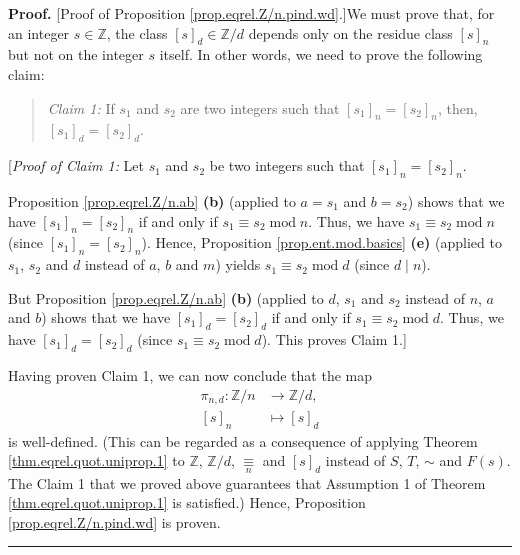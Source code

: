 \documentclass[numbers=enddot,12pt,final,onecolumn,notitlepage]{scrartcl}%
\numberwithin{exer}{subsection}
\theoremstyle{definition}
\newenvironment{statement}{\begin{quote}}{\end{quote}}
\newenvironment{proof}[1][Proof]{\noindent\textbf{#1.} }{\ \rule{0.5em}{0.5em}}
\begin{document}
\begin{proof}
[Proof of Proposition \ref{prop.eqrel.Z/n.pind.wd}.]We must prove that, for an
integer $s\in\mathbb{Z}$, the class $\left[  s\right]  _{d}\in\mathbb{Z}/d$
depends only on the residue class $\left[  s\right]  _{n}$ but not on the
integer $s$ itself. In other words, we need to prove the following claim:

\begin{statement}
\textit{Claim 1:} If $s_{1}$ and $s_{2}$ are two integers such that $\left[
s_{1}\right]  _{n}=\left[  s_{2}\right]  _{n}$, then, $\left[  s_{1}\right]
_{d}=\left[  s_{2}\right]  _{d}$.
\end{statement}

[\textit{Proof of Claim 1:} Let $s_{1}$ and $s_{2}$ be two integers such that
$\left[  s_{1}\right]  _{n}=\left[  s_{2}\right]  _{n}$.

Proposition \ref{prop.eqrel.Z/n.ab} \textbf{(b)} (applied to $a=s_{1}$ and
$b=s_{2}$) shows that we have $\left[  s_{1}\right]  _{n}=\left[
s_{2}\right]  _{n}$ if and only if $s_{1}\equiv s_{2}\operatorname{mod}n$.
Thus, we have $s_{1}\equiv s_{2}\operatorname{mod}n$ (since $\left[
s_{1}\right]  _{n}=\left[  s_{2}\right]  _{n}$). Hence, Proposition
\ref{prop.ent.mod.basics} \textbf{(e)} (applied to $s_{1}$, $s_{2}$ and $d$
instead of $a$, $b$ and $m$) yields $s_{1}\equiv s_{2}\operatorname{mod}d$
(since $d\mid n$).

But Proposition \ref{prop.eqrel.Z/n.ab} \textbf{(b)} (applied to $d$, $s_{1}$
and $s_{2}$ instead of $n$, $a$ and $b$) shows that we have $\left[
s_{1}\right]  _{d}=\left[  s_{2}\right]  _{d}$ if and only if $s_{1}\equiv
s_{2}\operatorname{mod}d$. Thus, we have $\left[  s_{1}\right]  _{d}=\left[
s_{2}\right]  _{d}$ (since $s_{1}\equiv s_{2}\operatorname{mod}d$). This
proves Claim 1.]

Having proven Claim 1, we can now conclude that the map%
\begin{align*}
\pi_{n,d}:\mathbb{Z}/n  &  \rightarrow\mathbb{Z}/d,\\
\left[  s\right]  _{n}  &  \mapsto\left[  s\right]  _{d}%
\end{align*}
is well-defined. (This can be regarded as a consequence of applying Theorem
\ref{thm.eqrel.quot.uniprop.1} to $\mathbb{Z}$, $\mathbb{Z}/d$,
$\underset{n}{\equiv}$ and $\left[  s\right]  _{d}$ instead of $S$, $T$,
$\sim$ and $F\left(  s\right)  $. The Claim 1 that we proved above guarantees
that Assumption 1 of Theorem \ref{thm.eqrel.quot.uniprop.1} is satisfied.)
Hence, Proposition \ref{prop.eqrel.Z/n.pind.wd} is proven.
\end{proof}
\end{document}
